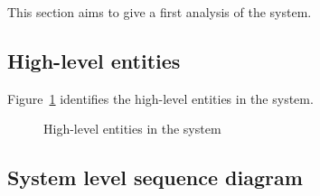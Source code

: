 This section aims to give a first analysis of the system.

\subsection{High-level entities}
	Figure~\ref{fig:analysis-model} identifies the high-level entities in the system.
	\begin{figure}
		\centering
		\caption{High-level entities in the system}
		\label{fig:analysis-model}
	\end{figure}
	
\subsection{System level sequence diagram}
	
